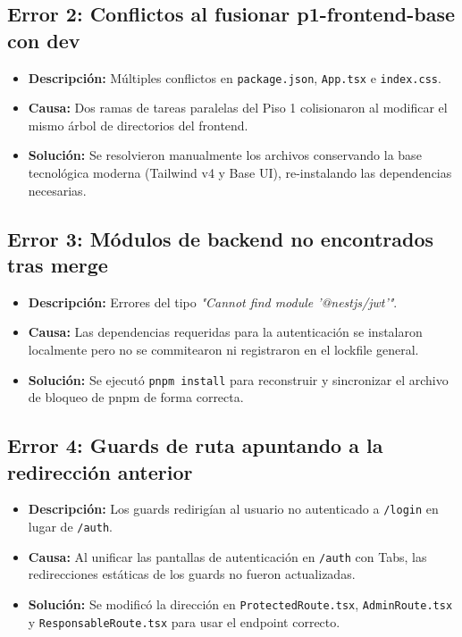 \documentclass[11pt,a4paper]{article}
\begin{document}
\subsection{Error 2: Conflictos al fusionar p1-frontend-base con dev}
\begin{itemize}
    \item \textbf{Descripción:} Múltiples conflictos en \texttt{package.json}, \texttt{App.tsx} e \texttt{index.css}.
    \item \textbf{Causa:} Dos ramas de tareas paralelas del Piso 1 colisionaron al modificar el mismo árbol de directorios del frontend.
    \item \textbf{Solución:} Se resolvieron manualmente los archivos conservando la base tecnológica moderna (Tailwind v4 y Base UI), re-instalando las dependencias necesarias.
\end{itemize}

\subsection{Error 3: Módulos de backend no encontrados tras merge}
\begin{itemize}
    \item \textbf{Descripción:} Errores del tipo \textit{"Cannot find module '@nestjs/jwt'"}.
    \item \textbf{Causa:} Las dependencias requeridas para la autenticación se instalaron localmente pero no se commitearon ni registraron en el lockfile general.
    \item \textbf{Solución:} Se ejecutó \texttt{pnpm install} para reconstruir y sincronizar el archivo de bloqueo de pnpm de forma correcta.
\end{itemize}

\subsection{Error 4: Guards de ruta apuntando a la redirección anterior}
\begin{itemize}
    \item \textbf{Descripción:} Los guards redirigían al usuario no autenticado a \texttt{/login} en lugar de \texttt{/auth}.
    \item \textbf{Causa:} Al unificar las pantallas de autenticación en \texttt{/auth} con Tabs, las redirecciones estáticas de los guards no fueron actualizadas.
    \item \textbf{Solución:} Se modificó la dirección en \texttt{ProtectedRoute.tsx}, \texttt{AdminRoute.tsx} y \texttt{ResponsableRoute.tsx} para usar el endpoint correcto.
\end{itemize}
\end{document}
